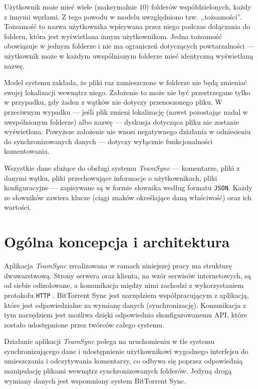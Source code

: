 \documentclass[polish,a4paper,twoside]{ppfcmthesis}
\begin{document}
Użytkownik może mieć wiele (maksymalnie $10$) folderów współdzielonych, każdy z innymi węzłami. Z tego powodu w modelu uwzględniono tzw. ,,tożsamości''. Tożsamość to nazwa użytkownika wpisywana przez niego podczas dołączania do folderu, która jest wyświetlana innym użytkownikom. Jedna tożsamość obowiązuje w jednym folderze i nie ma ograniczeń dotyczących powtarzalności --- użytkownik może w każdym uwspólnianym folderze mieć identyczną wyświetlaną nazwę.

Model systemu zakłada, że pliki raz zamieszczone w folderze nie będą zmieniać swojej lokalizacji wewnątrz niego. Założenie to może nie być przestrzegane tylko w przypadku, gdy żaden z wątków nie dotyczy przenoszonego pliku. W przeciwnym wypadku --- jeśli plik zmieni lokalizację (nawet pozostając nadal w uwspólnionym folderze) albo nazwę --- dyskusja dotycząca pliku nie zostanie wyświetlona. Powyższe założenie nie wnosi negatywnego działania w odniesieniu do synchronizowanych danych --- dotyczy wyłącznie funkcjonalności komentowania.

Wszystkie dane służące do obsługi systemu \emph{TeamSync} --- komentarze, pliki z danymi wątku, pliki przechowujące informacje o użytkownikach, pliki konfiguracyjne --- zapisywane są w formie słownika według formatu \texttt{JSON}. Każdy ze słowników zawiera klucze (ciągi znaków określające daną właściwość) oraz ich wartości.

\chapter{Ogólna koncepcja i architektura}

Aplikacja \emph{TeamSync} zrealizowana w ramach niniejszej pracy ma strukturę dwuwarstwową. Strony serwera oraz klienta, na wzór serwisów internetowych, są od siebie odizolowane, a komunikacja między nimi zachodzi z wykorzystaniem protokołu \texttt{HTTP} \cite{http} \cite{httparticle}. BitTorrent Sync jest narzędziem współpracującym z aplikacją, które jest odpowiedzialne za wymianę danych (synchronizację). Komunikacja z tym narzędziem jest możliwa dzięki odpowiednio skonfigurowanemu API, które zostało udostępnione przez twórców całego systemu.

Działanie aplikacji \emph{TeamSync} polega na uruchomieniu w tle systemu synchronizującego dane i udostępnienie użytkownikowi wygodnego interfejsu do umieszczania i odczytywania komentarzy, co odbywa się poprzez odpowiednią manipulację plikami wewnątrz synchronizowanych folderów. Jedyną drogą wymiany danych jest wspomniany system BitTorrent Sync.
\end{document}
